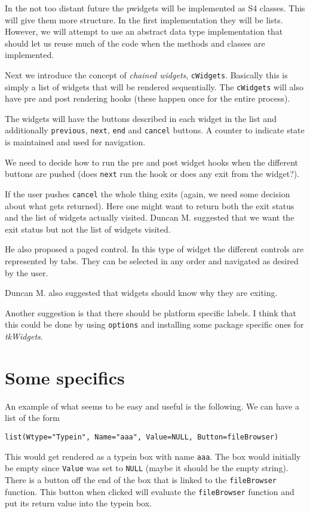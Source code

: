 \documentclass{article}
\begin{document}
In the not too distant future the pwidgets will be implemented as S4
classes. This will give them more structure. In the first
implementation they will be lists. However, we will attempt to use an
abstract data type implementation that should let us reuse much of the
code when the methods and classes are implemented.

Next we introduce the concept of {\em chained widgets},
\verb+cWidgets+. 
Basically this is simply a list of widgets that will be rendered
sequentially. 
The \verb+cWidgets+ will also have pre and post rendering hooks (these
happen once for the entire process).

The widgets will have the buttons described in each widget in the list
and additionally \verb+previous+, \verb+next+, \verb+end+ and
\verb+cancel+ buttons.
A counter to indicate state is maintained and used for navigation.

We need to decide how to run the pre and post widget hooks when the
different buttons are pushed (does \verb+next+ run the hook or does
any exit from the widget?).

If the user pushes \verb+cancel+ the whole thing exits (again, we need
some decision about what gets returned). Here one might want to return
both the exit status and the list of widgets actually visited.
Duncan M. suggested that we want the exit status but not the list of
widgets visited.

He also proposed a paged control. In this type of widget the different
controls are represented by tabs. They can be selected in any order
and navigated as desired by the user.

Duncan M. also suggested that widgets should know why they are
exiting.

Another suggestion is that there should be platform specific labels.
I think that this could be done by using \verb+options+ and installing
some package specific ones for {\em tkWidgets}.

\section*{Some specifics}

An example of what seems to be easy and useful is the following.
We can have a list of the form
\begin{verbatim}
list(Wtype="Typein", Name="aaa", Value=NULL, Button=fileBrowser)
\end{verbatim}
This would get rendered as a typein box with name \verb+aaa+. The box
would initially be empty since \verb+Value+ was set to \verb+NULL+
(maybe it should be the empty string). There is a button off the end
of the box that is linked to the \verb+fileBrowser+ function.
This button when clicked will evaluate the \verb+fileBrowser+ function
and put its return value into the typein box.
\end{document}
